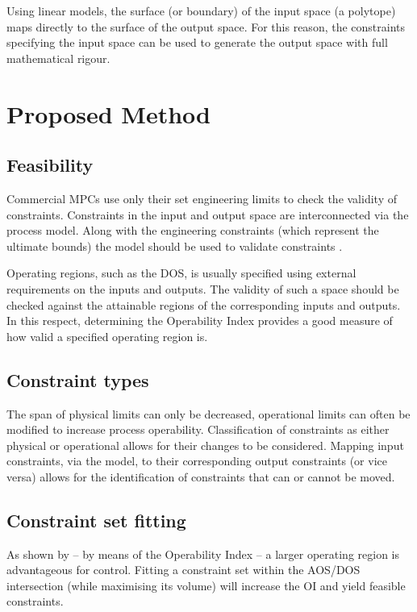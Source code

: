 \documentclass[final,authoryear,5pt,times,twocolumn]{elsarticle}
\begin{document}
Using linear models, the surface (or boundary) of the input space (a polytope) maps directly to the surface of the output space.
For this reason, the constraints specifying the input space can be used to generate the output space with full mathematical rigour.



\section{Proposed Method}\label{sec:method}

\subsection{Feasibility}\label{sec:feasibility}
Commercial MPCs use only their set engineering limits to check the validity of constraints.
Constraints in the input and output space are interconnected via the process model.
Along with the engineering constraints (which represent the ultimate bounds) the model should be used to validate constraints \citep{vinsonphd}. 

Operating regions, such as the DOS, is usually specified using external requirements on the inputs and outputs.
The validity of such a space should be checked against the attainable regions of the corresponding inputs and outputs.
In this respect, determining the Operability Index provides a good measure of how valid a specified operating region is.

\subsection{Constraint types}\label{sec:contypes}
The span of physical limits can only be decreased, operational limits can often be modified to increase process operability.
Classification of constraints as either physical or operational allows for their changes to be considered.
Mapping input constraints, via the model, to their corresponding output constraints (or vice versa) allows for the identification of constraints that can or cannot be moved.

\subsection{Constraint set fitting}\label{sec:setfit}
As shown by \citet{vinsonartoi} -- by means of the Operability Index -- a larger operating region is advantageous for control.
Fitting a constraint set within the AOS/DOS intersection (while maximising its volume) will increase the OI and yield feasible constraints.
\end{document}

